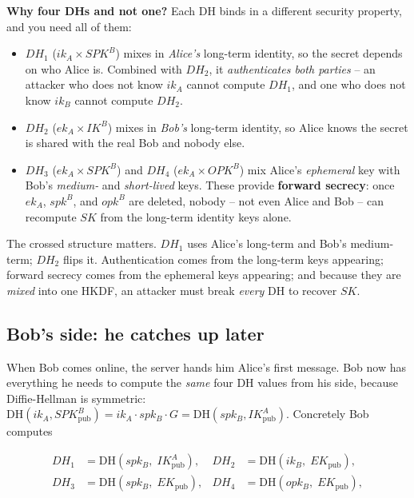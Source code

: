 \begin{whybox}
\textbf{Why four DHs and not one?} Each DH binds in a different security property, and you need all of them:
\begin{itemize}
  \item $DH_1$ ($ik_A \times SPK^B$) mixes in \emph{Alice's} long-term identity, so the secret depends on who Alice is. Combined with $DH_2$, it \emph{authenticates both parties} -- an attacker who does not know $ik_A$ cannot compute $DH_1$, and one who does not know $ik_B$ cannot compute $DH_2$.
  \item $DH_2$ ($ek_A \times IK^B$) mixes in \emph{Bob's} long-term identity, so Alice knows the secret is shared with the real Bob and nobody else.
  \item $DH_3$ ($ek_A \times SPK^B$) and $DH_4$ ($ek_A \times OPK^B$) mix Alice's \emph{ephemeral} key with Bob's \emph{medium-} and \emph{short-lived} keys. These provide \textbf{forward secrecy}: once $ek_A$, $spk^B$, and $opk^B$ are deleted, nobody -- not even Alice and Bob -- can recompute $SK$ from the long-term identity keys alone.
\end{itemize}
The crossed structure matters. $DH_1$ uses Alice's long-term and Bob's medium-term; $DH_2$ flips it. Authentication comes from the long-term keys appearing; forward secrecy comes from the ephemeral keys appearing; and because they are \emph{mixed} into one HKDF, an attacker must break \emph{every} DH to recover $SK$.
\end{whybox}

\subsection{Bob's side: he catches up later}
\label{ch27:x3dh-bob}

When Bob comes online, the server hands him Alice's first message. Bob now has everything he needs to compute the \emph{same} four DH values from his side, because Diffie-Hellman is symmetric: $\mathrm{DH}(ik_A, SPK^B_{\mathrm{pub}}) = ik_A \cdot spk_B \cdot G = \mathrm{DH}(spk_B, IK^A_{\mathrm{pub}})$. Concretely Bob computes

\begin{align*}
DH_1 &= \mathrm{DH}(spk_B,\; IK_{\mathrm{pub}}^A), &
DH_2 &= \mathrm{DH}(ik_B,\; EK_{\mathrm{pub}}),\\
DH_3 &= \mathrm{DH}(spk_B,\; EK_{\mathrm{pub}}), &
DH_4 &= \mathrm{DH}(opk_B,\; EK_{\mathrm{pub}}),
\end{align*}

